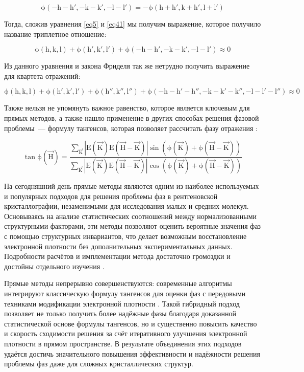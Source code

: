 \begin{equation}\label{eq5}
\mathrm{ 
\phi(-h-h',-k-k',-l-l') = -\phi(h+h', k+h', l+l')}
\end{equation}

Тогда, сложив уравнения \ref{eq5} и \ref{eq41} мы получим выражение, которое получило название триплетное отношение:

\begin{equation}\label{eq6}
\mathrm{ 
\phi(h,k,l)+\phi(h',k',l') +\phi(-h-h',-k-k',-l-l')\approx 0}
\end{equation}

Из данного уравнения и закона Фриделя так же нетрудно получить выражение для квартета отражений:

\begin{equation}\label{eq7}
\mathrm{ 
\phi(h,k,l)+\phi(h',k',l') +\phi(h'',k'',l'')+\phi(-h-h'-h'',-k-k'-k'',-l-l'-l'')\approx 0}
\end{equation}

Также нельзя не упомянуть важное равенство, которое является ключевым для прямых методов, а также нашло применение в других способах решения фазовой проблемы~--- формулу тангенсов, которая позволяет рассчитать фазу отражения \cite{karle_symbolic_1966}: 
 
 \begin{equation}\label{sigma2}
 	\mathrm{\tan\phi(\overrightarrow{H}) = \frac{\sum\limits_{\overrightarrow{K}}|E(\overrightarrow{K})E(\overrightarrow{H}-\overrightarrow{K})|\sin(\phi(\overrightarrow{K})+\phi(\overrightarrow{H}-\overrightarrow{K}))}{\sum\limits_{\overrightarrow{K}}|E(\overrightarrow{K})E(\overrightarrow{H}-\overrightarrow{K})|\cos(\phi(\overrightarrow{K})+\phi(\overrightarrow{H}-\overrightarrow{K}))}
 	}
 \end{equation}

На сегодняшний день прямые методы являются одним из наиболее используемых и популярных подходов для решения проблемы фаз в рентгеновской кристаллографии, незаменимыми для исследования малых и средних молекул. Основываясь на анализе статистических соотношений между нормализованными структурными факторами, эти методы позволяют оценить вероятные значения фаз с помощью структурных инвариантов, что делает возможным восстановление электронной плотности без дополнительных экспериментальных данных. Подробности расчётов и имплементации метода достаточно громоздки и достойны отдельного изучения \cite{giacovazzo_direct_1998}.

Прямые методы непрерывно совершенствуются: современные алгоритмы интегрируют классическую формулу тангенсов для оценки фаз с передовыми техниками модификации электронной плотности \cite{burla_robust_2013}. Такой гибридный подход позволяет не только получить более надёжные фазы благодаря доказанной статистической основе формулы тангенсов, но и существенно повысить качество и скорость сходимости решения за счёт итеративного улучшения электронной плотности в прямом пространстве. В результате объединения этих подходов удаётся достичь значительного повышения эффективности и надёжности решения проблемы фаз даже для сложных кристаллических структур.

